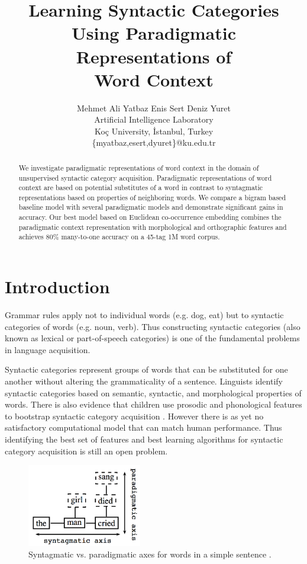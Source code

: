 \documentclass[11pt]{article}
\title{Learning Syntactic Categories Using Paradigmatic
  Representations of\\ Word Context}
\author{
Mehmet Ali Yatbaz \hspace*{10mm} Enis Sert \hspace*{10mm} Deniz Yuret \\
Artificial Intelligence Laboratory \\
Ko\c{c} University, \.Istanbul, Turkey \\
\{myatbaz,esert,dyuret\}@ku.edu.tr
}
\date{}
\begin{document}
\maketitle
\begin{abstract}

We investigate paradigmatic representations of word context in the
domain of unsupervised syntactic category acquisition.  Paradigmatic
representations of word context are based on potential substitutes of
a word in contrast to syntagmatic representations based on properties
of neighboring words.  We compare a bigram based baseline model with
several paradigmatic models and demonstrate significant gains in
accuracy.  Our best model based on Euclidean co-occurrence embedding
combines the paradigmatic context representation with morphological
and orthographic features and achieves 80\% many-to-one accuracy on a
45-tag 1M word corpus.
\end{abstract}

\section{Introduction}
\label{sec:intro}

Grammar rules apply not to individual words (e.g. dog, eat) but to
syntactic categories of words (e.g. noun, verb).  Thus constructing
syntactic categories (also known as lexical or part-of-speech
categories) is one of the fundamental problems in language
acquisition.

Syntactic categories represent groups of words that can be substituted
for one another without altering the grammaticality of a sentence.
Linguists identify syntactic categories based on semantic, syntactic,
and morphological properties of words.  There is also evidence that
children use prosodic and phonological features to bootstrap syntactic
category acquisition \cite{ambridge2011child}.  However there is as
yet no satisfactory computational model that can match human
performance.  Thus identifying the best set of features and best
learning algorithms for syntactic category acquisition is still an
open problem.

\begin{figure}[b] \centering
\includegraphics[width=50mm]{paradigmatic.png}
% 
\caption{Syntagmatic vs. paradigmatic axes for words in a simple
  sentence \cite{chandler2007semiotics}.}
\label{fig:paradigmatic}
\end{figure}
\end{document}
